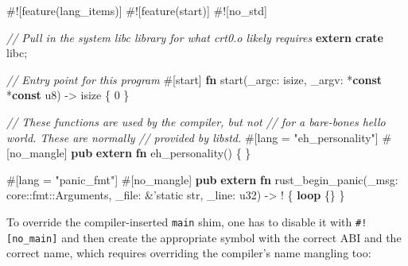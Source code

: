 \documentclass[a4paper,]{book}
\newenvironment{Shaded}{\begin{snugshade}}{\end{snugshade}}
\newcommand{\KeywordTok}[1]{\textcolor[rgb]{0.13,0.29,0.53}{\textbf{{#1}}}}
\newcommand{\DataTypeTok}[1]{\textcolor[rgb]{0.13,0.29,0.53}{{#1}}}
\newcommand{\DecValTok}[1]{\textcolor[rgb]{0.00,0.00,0.81}{{#1}}}
\newcommand{\StringTok}[1]{\textcolor[rgb]{0.31,0.60,0.02}{{#1}}}
\newcommand{\CommentTok}[1]{\textcolor[rgb]{0.56,0.35,0.01}{\textit{{#1}}}}
\newcommand{\OtherTok}[1]{\textcolor[rgb]{0.56,0.35,0.01}{{#1}}}
\newcommand{\AttributeTok}[1]{\textcolor[rgb]{0.77,0.63,0.00}{{#1}}}
\newcommand{\NormalTok}[1]{{#1}}
\begin{document}
\begin{Shaded}
\begin{Highlighting}[]
\AttributeTok{#![}\NormalTok{feature}\AttributeTok{(}\NormalTok{lang_items}\AttributeTok{)]}
\AttributeTok{#![}\NormalTok{feature}\AttributeTok{(}\NormalTok{start}\AttributeTok{)]}
\AttributeTok{#![}\NormalTok{no_std}\AttributeTok{]}

\CommentTok{// Pull in the system libc library for what crt0.o likely requires}
\KeywordTok{extern} \KeywordTok{crate} \NormalTok{libc;}

\CommentTok{// Entry point for this program}
\AttributeTok{#[}\NormalTok{start}\AttributeTok{]}
\KeywordTok{fn} \NormalTok{start(_argc: }\DataTypeTok{isize}\NormalTok{, _argv: *}\KeywordTok{const} \NormalTok{*}\KeywordTok{const} \DataTypeTok{u8}\NormalTok{) -> }\DataTypeTok{isize} \NormalTok{\{}
    \DecValTok{0}
\NormalTok{\}}

\CommentTok{// These functions are used by the compiler, but not}
\CommentTok{// for a bare-bones hello world. These are normally}
\CommentTok{// provided by libstd.}
\AttributeTok{#[}\NormalTok{lang }\AttributeTok{=} \StringTok{"eh_personality"}\AttributeTok{]}
\AttributeTok{#[}\NormalTok{no_mangle}\AttributeTok{]}
\KeywordTok{pub} \KeywordTok{extern} \KeywordTok{fn} \NormalTok{eh_personality() \{}
\NormalTok{\}}

\AttributeTok{#[}\NormalTok{lang }\AttributeTok{=} \StringTok{"panic_fmt"}\AttributeTok{]}
\AttributeTok{#[}\NormalTok{no_mangle}\AttributeTok{]}
\KeywordTok{pub} \KeywordTok{extern} \KeywordTok{fn} \NormalTok{rust_begin_panic(_msg: core::fmt::Arguments,}
                               \NormalTok{_file: &}\OtherTok{'static} \DataTypeTok{str}\NormalTok{,}
                               \NormalTok{_line: }\DataTypeTok{u32}\NormalTok{) -> ! \{}
    \KeywordTok{loop} \NormalTok{\{\}}
\NormalTok{\}}
\end{Highlighting}
\end{Shaded}

To override the compiler-inserted \texttt{main} shim, one has to disable
it with \texttt{\#!{[}no\_main{]}} and then create the appropriate
symbol with the correct ABI and the correct name, which requires
overriding the compiler's name mangling too:
\end{document}
